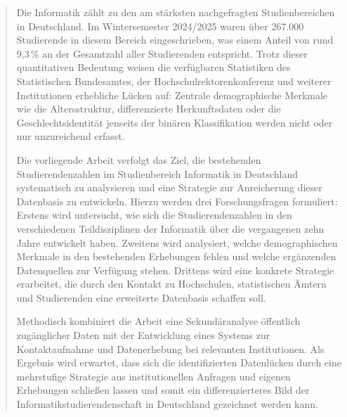 \begin{abstract}
\justifying %
\noindent

Die Informatik zählt zu den am stärksten nachgefragten Studienbereichen in Deutschland. Im Wintersemester 2024/2025 waren über 267.000 Studierende in diesem Bereich eingeschrieben, was einem Anteil von rund 9,3\,\% an der Gesamtzahl aller Studierenden entspricht. Trotz dieser quantitativen Bedeutung weisen die verfügbaren Statistiken des Statistischen Bundesamtes, der Hochschulrektorenkonferenz und weiterer Institutionen erhebliche Lücken auf: Zentrale demographische Merkmale wie die Altersstruktur, differenzierte Herkunftsdaten oder die Geschlechtsidentität jenseits der binären Klassifikation werden nicht oder nur unzureichend erfasst.

Die vorliegende Arbeit verfolgt das Ziel, die bestehenden Studierendenzahlen im Studienbereich Informatik in Deutschland systematisch zu analysieren und eine Strategie zur Anreicherung dieser Datenbasis zu entwickeln. Hierzu werden drei Forschungsfragen formuliert: Erstens wird untersucht, wie sich die Studierendenzahlen in den verschiedenen Teildisziplinen der Informatik über die vergangenen zehn Jahre entwickelt haben. Zweitens wird analysiert, welche demographischen Merkmale in den bestehenden Erhebungen fehlen und welche ergänzenden Datenquellen zur Verfügung stehen. Drittens wird eine konkrete Strategie erarbeitet, die durch den Kontakt zu Hochschulen, statistischen Ämtern und Studierenden eine erweiterte Datenbasis schaffen soll.

Methodisch kombiniert die Arbeit eine Sekundäranalyse öffentlich zugänglicher Daten mit der Entwicklung eines Systems zur Kontaktaufnahme und Datenerhebung bei relevanten Institutionen. Als Ergebnis wird erwartet, dass sich die identifizierten Datenlücken durch eine mehrstufige Strategie aus institutionellen Anfragen und eigenen Erhebungen schließen lassen und somit ein differenzierteres Bild der Informatikstudierendenschaft in Deutschland gezeichnet werden kann.
\end{abstract}
